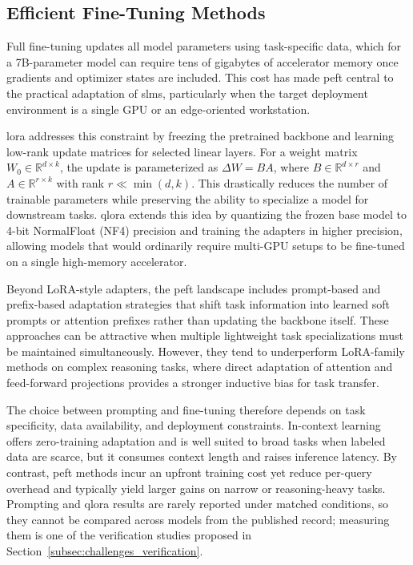 \subsection{Efficient Fine-Tuning Methods}
\label{subsec:background_efficient_finetuning}
Full fine-tuning updates all model parameters using task-specific data, which for a 7B-parameter model can require tens of gigabytes of accelerator memory once gradients and optimizer states are included. This cost has made \gls{peft} central to the practical adaptation of \glspl{slm}, particularly when the target deployment environment is a single GPU or an edge-oriented workstation.

\gls{lora} \citep{hu2022lora} addresses this constraint by freezing the pretrained backbone and learning low-rank update matrices for selected linear layers. For a weight matrix $W_0 \in \mathbb{R}^{d \times k}$, the update is parameterized as $\Delta W = BA$, where $B \in \mathbb{R}^{d \times r}$ and $A \in \mathbb{R}^{r \times k}$ with rank $r \ll \min(d,k)$. This drastically reduces the number of trainable parameters while preserving the ability to specialize a model for downstream tasks. \gls{qlora} \citep{dettmers2023qlora} extends this idea by quantizing the frozen base model to 4-bit NormalFloat (NF4) precision and training the adapters in higher precision, allowing models that would ordinarily require multi-GPU setups to be fine-tuned on a single high-memory accelerator.

Beyond LoRA-style adapters, the \gls{peft} landscape includes prompt-based and prefix-based adaptation strategies that shift task information into learned soft prompts or attention prefixes rather than updating the backbone itself. These approaches can be attractive when multiple lightweight task specializations must be maintained simultaneously. However, they tend to underperform LoRA-family methods on complex reasoning tasks, where direct adaptation of attention and feed-forward projections provides a stronger inductive bias for task transfer.

The choice between prompting and fine-tuning therefore depends on task specificity, data availability, and deployment constraints. In-context learning offers zero-training adaptation and is well suited to broad tasks when labeled data are scarce, but it consumes context length and raises inference latency. By contrast, \gls{peft} methods incur an upfront training cost yet reduce per-query overhead and typically yield larger gains on narrow or reasoning-heavy tasks. Prompting and \gls{qlora} results are rarely reported under matched conditions, so they cannot be compared across models from the published record; measuring them is one of the verification studies proposed in Section~\ref{subsec:challenges_verification}.


